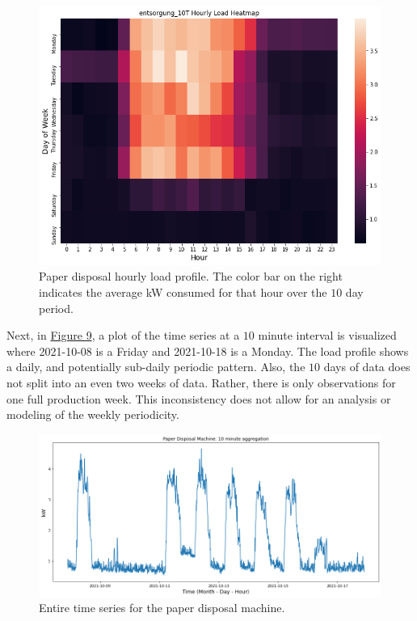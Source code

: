 \begin{figure}[H]
\centering
\graphicspath{ {./images/} }
\includegraphics[scale=0.55]{images/entsorgung_hourly_heatmap.png}
\caption{Paper disposal hourly load profile. The color bar on the right indicates the average kW consumed for that hour over the $10$ day period.}
\end{figure}

Next, in \hyperlink{figure.9}{Figure 9}, a plot of the time series at a $10$ minute interval is visualized where 2021-10-08 is a Friday and 2021-10-18 is a Monday. The load profile shows a daily, and potentially sub-daily periodic pattern. Also, the $10$ days of data does not split into an even two weeks of data. Rather, there is only observations for one full production week. This inconsistency does not allow for an analysis or modeling of the weekly periodicity. 

\begin{figure}[H]
\centering
\graphicspath{ {./images/} }
\includegraphics[scale=0.49]{images/entsorgung_10T_series.png}
\caption{Entire time series for the paper disposal machine.}
\end{figure}

